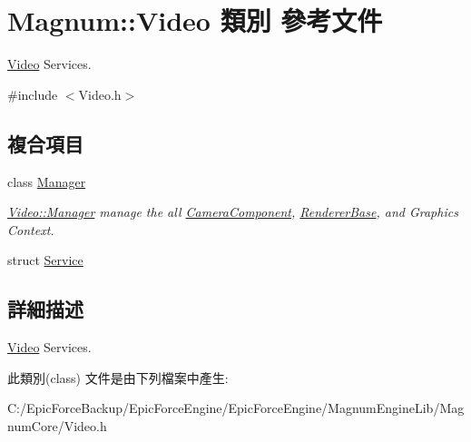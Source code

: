 \hypertarget{class_magnum_1_1_video}{}\section{Magnum\+:\+:Video 類別 參考文件}
\label{class_magnum_1_1_video}


\hyperlink{class_magnum_1_1_video}{Video} Services.  




{\ttfamily \#include $<$Video.\+h$>$}

\subsection*{複合項目}
\begin{DoxyCompactItemize}
\item 
class \hyperlink{class_magnum_1_1_video_1_1_manager}{Manager}
\begin{DoxyCompactList}\small\item\em \hyperlink{class_magnum_1_1_video_1_1_manager}{Video\+::\+Manager} manage the all \hyperlink{class_magnum_1_1_camera_component}{Camera\+Component}, \hyperlink{class_magnum_1_1_renderer_base}{Renderer\+Base}, and Graphics Context. \end{DoxyCompactList}\item 
struct \hyperlink{struct_magnum_1_1_video_1_1_service}{Service}
\end{DoxyCompactItemize}


\subsection{詳細描述}
\hyperlink{class_magnum_1_1_video}{Video} Services. 

此類別(class) 文件是由下列檔案中產生\+:\begin{DoxyCompactItemize}
\item 
C\+:/\+Epic\+Force\+Backup/\+Epic\+Force\+Engine/\+Epic\+Force\+Engine/\+Magnum\+Engine\+Lib/\+Magnum\+Core/Video.\+h\end{DoxyCompactItemize}
